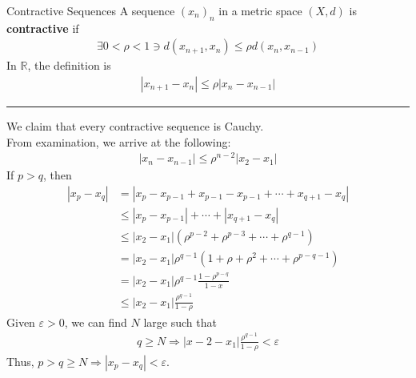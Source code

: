 \documentclass[8pt]{extarticle}
\newcommand{\R}{\mathbb{R}}
\begin{document}
  \begin{problem}{Contractive Sequences}
    A sequence $(x_n)_n$ in a metric space $(X,d)$ is \textbf{contractive} if
    \begin{align*}
      \exists 0 < \rho < 1 \ni d(x_{n+1},x_n) \leq \rho d(x_{n},x_{n-1}) \tag*{$\forall n\geq 1$}
    \end{align*}
    In $\R$, the definition is
    \begin{align*}
      |x_{n+1}-x_n| \leq \rho |x_n - x_{n-1}|
    \end{align*}
    \vspace{4pt}
    \rule{\textwidth}{0.4pt}
    \vspace{4pt}
    We claim that every contractive sequence is Cauchy.\\

    From examination, we arrive at the following:
    \begin{align*}
      |x_{n} - x_{n-1}| \leq \rho^{n-2}|x_{2}-x_{1}| \tag*{($\ast$)}
    \end{align*}
    If $p > q$, then
    \begin{align*}
      |x_{p}-x_{q}| &= |x_{p}-x_{p-1} + x_{p-1}-x_{p-1} + \cdots + x_{q+1}-x_q|\\
                    &\leq |x_p-x_{p-1}| + \cdots + |x_{q+1}-x_q|\tag*{Triangle Inequality}\\
                    &\leq |x_2-x_1| \left(\rho^{p-2} + \rho^{p-3} + \cdots + \rho^{q-1}\right)\\
                    &= |x_2-x_1| \rho^{q-1} \left(1 + \rho + \rho^2 + \cdots + \rho^{p-q-1}\right)\\
                    &= |x_2-x_1|\rho^{q-1}\frac{1-\rho^{p-q}}{1-x}\tag*{Finite Geometric Sequence}\\
                    &\leq |x_{2}-x_1| \frac{\rho^{q-1}}{1-\rho}
    \end{align*}
    Given $\varepsilon > 0$, we can find $N$ large such that 
    \begin{align*}
      q\geq N \Rightarrow |x-2-x_1| \frac{\rho^{q-1}}{1-\rho} < \varepsilon
    \end{align*}
    Thus, $p > q \geq N \Rightarrow |x_p-x_q| < \varepsilon$.
  \end{problem}
\end{document}
